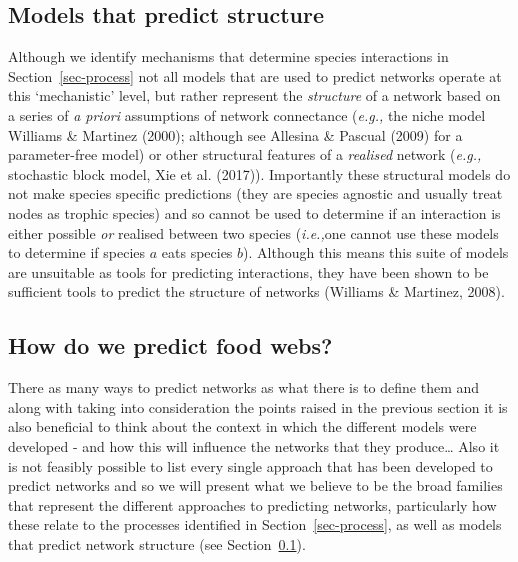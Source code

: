 \documentclass[
]{article}
\begin{document}
\subsection{Models that predict structure}\label{sec-network-build}

Although we identify mechanisms that determine species interactions in
Section~\ref{sec-process} not all models that are used to predict
networks operate at this `mechanistic' level, but rather represent the
\emph{structure} of a network based on a series of \emph{a priori}
assumptions of network connectance (\emph{e.g.,} the niche model
Williams \& Martinez (2000); although see Allesina \& Pascual (2009) for
a parameter-free model) or other structural features of a
\emph{realised} network (\emph{e.g.,} stochastic block model, Xie et al.
(2017)). Importantly these structural models do not make species
specific predictions (they are species agnostic and usually treat nodes
as trophic species) and so cannot be used to determine if an interaction
is either possible \emph{or} realised between two species
(\emph{i.e.,}one cannot use these models to determine if species \(a\)
eats species \(b\)). Although this means this suite of models are
unsuitable as tools for predicting interactions, they have been shown to
be sufficient tools to predict the structure of networks (Williams \&
Martinez, 2008).

\subsection{How do we predict food
webs?}\label{how-do-we-predict-food-webs}

There as many ways to predict networks as what there is to define them
and along with taking into consideration the points raised in the
previous section it is also beneficial to think about the context in
which the different models were developed - and how this will influence
the networks that they produce\ldots{} Also it is not feasibly possible
to list every single approach that has been developed to predict
networks and so we will present what we believe to be the broad families
that represent the different approaches to predicting networks,
particularly how these relate to the processes identified in
Section~\ref{sec-process}, as well as models that predict network
structure (see Section~\ref{sec-network-build}).
\end{document}
